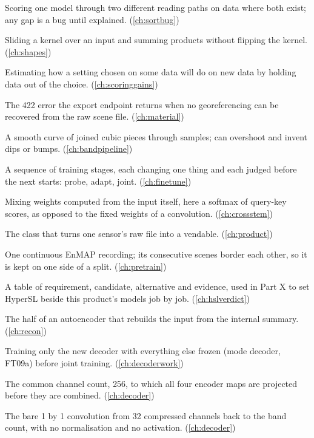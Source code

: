 \begin{description}[style=nextline,leftmargin=1.2em,font=\normalfont\bfseries]
\item[Cross-check (of data paths)] Scoring one model through two different reading paths on data where both exist; any gap is a bug until explained. (\cref{ch:sortbug})
\item[Cross-correlation] Sliding a kernel over an input and summing products without flipping the kernel. (\cref{ch:shapes})
\item[Cross-validation] Estimating how a setting chosen on some data will do on new data by holding data out of the choice. (\cref{ch:scoringgains})
\item[crs\_missing] The 422 error the export endpoint returns when no georeferencing can be recovered from the raw scene file. (\cref{ch:material})
\item[Cubic spline] A smooth curve of joined cubic pieces through samples; can overshoot and invent dips or bumps. (\cref{ch:bandpipeline})
\item[Curriculum] A sequence of training stages, each changing one thing and each judged before the next starts: probe, adapt, joint. (\cref{ch:finetune})
\item[Data-dependent weights] Mixing weights computed from the input itself, here a softmax of query-key scores, as opposed to the fixed weights of a convolution. (\cref{ch:crossstem})
\item[DatasetBuilder] The class that turns one sensor's raw file into a vendable. (\cref{ch:product})
\item[Datatake] One continuous EnMAP recording; its consecutive scenes border each other, so it is kept on one side of a split. (\cref{ch:pretrain})
\item[Decision table] A table of requirement, candidate, alternative and evidence, used in Part X to set HyperSL beside this product's models job by job. (\cref{ch:hslverdict})
\item[Decoder] The half of an autoencoder that rebuilds the input from the internal summary. (\cref{ch:recon})
\item[Decoder warm-up] Training only the new decoder with everything else frozen (mode decoder, FT09a) before joint training. (\cref{ch:decoderwork})
\item[Decoder width] The common channel count, 256, to which all four encoder maps are projected before they are combined. (\cref{ch:decoder})
\item[Decompressor] The bare 1 by 1 convolution from 32 compressed channels back to the band count, with no normalisation and no activation. (\cref{ch:decoder})

\end{description}
